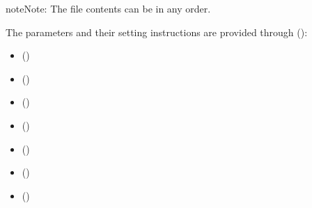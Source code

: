 \documentclass[letterpaper,10pt,english]{sphinxmanual}
\begin{document}
\begin{sphinxadmonition}{note}{Note:}
The file contents can be in any order.
\end{sphinxadmonition}

The parameters and their setting instructions
are provided through {\hyperref[\detokenize{input_files/ESTM_related_files/ESTMinput:estminput}]{}} ():
\begin{itemize}\setlength{\itemsep}{0pt}\setlength{\parskip}{0pt}
\item {} 
{\hyperref[\detokenize{input_files/ESTM_related_files/ESTMinput:cmdoption-arg-tsurfchoice}]{}} ()

\item {} 
{\hyperref[\detokenize{input_files/ESTM_related_files/ESTMinput:cmdoption-arg-evolvetibld}]{}} ()

\item {} 
{\hyperref[\detokenize{input_files/ESTM_related_files/ESTMinput:cmdoption-arg-ibldchmod}]{}} ()

\item {} 
{\hyperref[\detokenize{input_files/ESTM_related_files/ESTMinput:cmdoption-arg-lbc-soil}]{}} ()

\item {} 
{\hyperref[\detokenize{input_files/ESTM_related_files/ESTMinput:cmdoption-arg-theat-fix}]{}} ()

\item {} 
{\hyperref[\detokenize{input_files/ESTM_related_files/ESTMinput:cmdoption-arg-theat-off}]{}} ()

\item {} 
{\hyperref[\detokenize{input_files/ESTM_related_files/ESTMinput:cmdoption-arg-theat-on}]{}} ()

\end{itemize}
\end{document}
